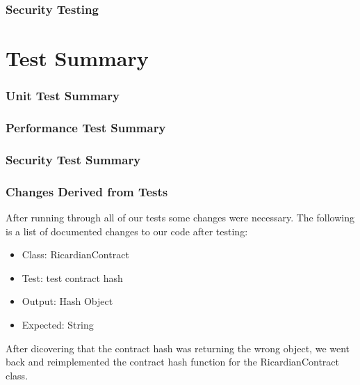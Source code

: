 \documentclass{article}
\begin{document}
\section{Security Testing}

\part*{Test Summary}
\section{Unit Test Summary}

\section{Performance Test Summary}

\section{Security Test Summary}

\section{Changes Derived from Tests}
After running through all of our tests some changes were necessary. The following is a list of documented changes to our code after testing:\newline
\newline
\begin{itemize}
\item Class: RicardianContract
\item Test: test contract hash
\item Output: Hash Object
\item Expected: String
\end{itemize} 
After dicovering that the contract hash was returning the wrong object, we went back and reimplemented the contract hash function for the RicardianContract class.
\end{document}
